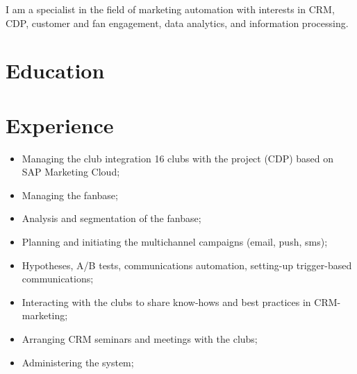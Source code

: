 \documentclass[11pt,a4paper,sans]{moderncv}
\begin{document}
 

\makecvtitle

I am a specialist in the field of marketing automation with interests in CRM, CDP, customer and fan engagement, data analytics, and information processing.

\section{Education}


\section{Experience}


\begin{itemize}
\item Managing the club integration 16 clubs with the project (CDP) based on SAP Marketing
Cloud;
\item Managing the fanbase;
\item Analysis and segmentation of the fanbase;
\item Planning and initiating the multichannel campaigns (email, push, sms);
\item Hypotheses, A/B tests, communications automation, setting-up trigger-based
communications;
\item Interacting with the clubs to share know-hows and best practices in CRM-marketing;
\item Arranging CRM seminars and meetings with the clubs;
\item Administering the system;\newline{}
\end{itemize}

\end{document}
